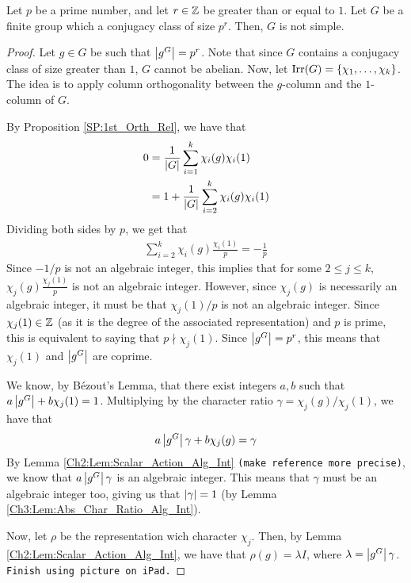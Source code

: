 \begin{boxtheorem}
    Let $p$ be a prime number, and let $r \in \mathbb{Z}$ be greater than or equal to $1$. Let $G$ be a finite group which a conjugacy class of size $p^r$. Then, $G$ is not simple.
\end{boxtheorem}
\begin{proof}
    Let $g \in G$ be such that $\left\lvert g^G \right\rvert = p^r$. Note that since $G$ contains a conjugacy class of size greater than $1$, $G$ cannot be abelian. Now, let $\operatorname{Irr}\!\left( G \right) = \left\{ \chi_1, \ldots, \chi_k \right\}$. The idea is to apply column orthogonality between the $g$-column and the $1$-column of $G$.

    By Proposition \ref{SP:1st_Orth_Rel}, we have that
    \begin{align*}
        0 &= \frac{1}{\left\lvert G \right\rvert} \sum_{i=1}^{k} \chi_i(g) \chi_i(1) \\
        &= 1 + \frac{1}{\left\lvert G \right\rvert} \sum_{i=2}^{k} \chi_i(g) \chi_i(1)
    \end{align*}
    Dividing both sides by $p$, we get that
    \begin{align*}
        \sum_{i=2}^{k} \chi_i(g) \frac{\chi_i(1)}{p} = -\frac{1}{p}
    \end{align*}
    Since $-1/p$ is not an algebraic integer, this implies that for some $2 \leq j \leq k$, $\chi_j(g) \frac{\chi_j(1)}{p}$ is not an algebraic integer. However, since $\chi_j(g)$ is necessarily an algebraic integer, it must be that $\chi_j(1)/p$ is not an algebraic integer. Since $\chi_j(1) \in \mathbb{Z}$ (as it is the degree of the associated representation) and $p$ is prime, this is equivalent to saying that $p \nmid \chi_j(1)$. Since $\left\lvert g^G \right\rvert = p^r$, this means that $\chi_j(1)$ and $\left\lvert g^G \right\rvert$ are coprime.
    
    We know, by Bézout's Lemma, that there exist integers $a, b$ such that $a\left\lvert g^G \right\rvert + b\chi_j(1) = 1$. Multiplying by the character ratio $\gamma = \chi_j(g) / \chi_j(1)$, we have that
    \begin{align*}
        a \left\lvert g^G \right\rvert \gamma + b\chi_j(g) = \gamma
    \end{align*}
    By Lemma \ref{Ch2:Lem:Scalar_Action_Alg_Int} \verb|(make reference more precise)|, we know that $a \left\lvert g^G \right\rvert \gamma$ is an algebraic integer. This means that $\gamma$ must be an algebraic integer too, giving us that $\left\lvert \gamma \right\rvert = 1$ (by Lemma \ref{Ch3:Lem:Abs_Char_Ratio_Alg_Int}).

    Now, let $\rho$ be the representation wich character $\chi_j$. Then,
    by Lemma \ref{Ch2:Lem:Scalar_Action_Alg_Int}, we have that $\rho(g) = \lambda I$, where $\lambda = \left\lvert g^G \right\rvert \gamma$. \verb|Finish using picture on iPad.|
\end{proof}


